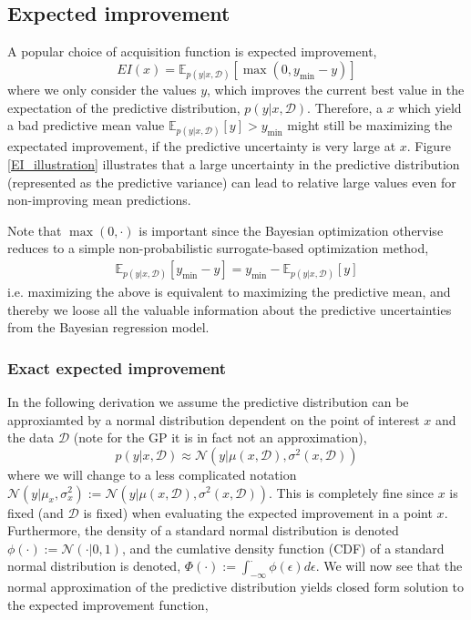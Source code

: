 \subsection{Expected improvement}
A popular choice of acquisition function is expected improvement, 
$$EI(x) = \mathbb{E}_{p(y|x,\mathcal{D})}[\max(0, y_{\min}-y)]$$ where we only consider the values
$y$, which improves the current best value in the expectation of the predictive distribution,
$p(y|x,\mathcal{D})$. Therefore, a $x$ which yield a bad predictive mean value
$\mathbb{E}_{p(y|x,\mathcal{D})}[y]> y_{\min}$ might still be maximizing the expectated improvement,
if the predictive uncertainty is very large at $x$. Figure \ref{EI_illustration} illustrates that a
large uncertainty in the predictive distribution (represented as the predictive variance) can lead
to relative large values even for non-improving mean predictions.


\begin{note2}    
    Note that $\max(0,\cdot)$ is important since the Bayesian optimization othervise reduces to
    a simple non-probabilistic surrogate-based optimization method,
    \begin{align*}
        \mathbb{E}_{p(y|x,\mathcal{D})}[y_{\min}-y] = y_{\min} - \mathbb{E}_{p(y|x,\mathcal{D})}[y]
    \end{align*}
    i.e. maximizing the above is equivalent to maximizing the predictive mean, and thereby we loose
    all the valuable information about the predictive uncertainties from the Bayesian regression model. 
\end{note2}

\subsubsection{Exact expected improvement} \label{ExactEI} 
In the following derivation we assume the
predictive distribution can be approxiamted by a normal distribution dependent on the point of
interest $x$ and the data $\mathcal{D}$ (note for the GP it is in fact not an approximation), 
$$p(y|x,\mathcal{D}) \approx \mathcal{N}(y|\mu(x,\mathcal{D}), \sigma^2(x,\mathcal{D}))$$ where we
will change to a less complicated notation $\mathcal{N}(y|\mu_x,
\sigma^2_x):=\mathcal{N}(y|\mu(x,\mathcal{D}), \sigma^2(x,\mathcal{D}))$. This is completely fine
since $x$ is fixed (and $\mathcal{D}$ is fixed) when evaluating the expected improvement in a point
$x$. %
Furthermore, the density of
a standard normal distribution is denoted $\phi(\cdot):=\mathcal{N}(\cdot | 0,1)$, and the cumlative
density function (CDF) of a standard normal distribution is denoted, $\Phi(\cdot) :=
\int_{-\infty}^{\cdot} \phi(\epsilon)d\epsilon$. We will now see that the normal approximation
of the predictive distribution yields closed form solution to the expected improvement function, 

